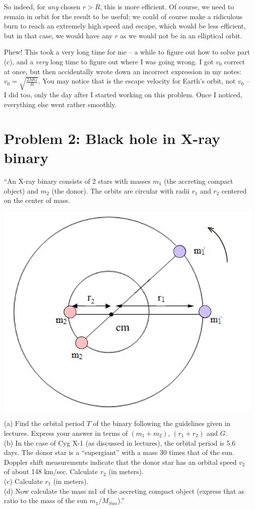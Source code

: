 \documentclass[8.01x]{subfiles}
\begin{document}
So indeed, for \emph{any} chosen $r > R$, this is more efficient. Of course, we need to remain in orbit for the result to be useful; we could of course make a ridiculous burn to reach an extremely high speed and escape, which would be less efficient, but in that case, we would have any $r$ as we would not be in an elliptical orbit.

Phew! This took a very long time for me -- a while to figure out how to solve part (c), and a \emph{very} long time to figure out where I was going wrong. I got $v_0$ correct at once, but then accidentally wrote down an incorrect expression in my notes: $\displaystyle v_0 = \sqrt{\frac{2 M G}{R}}$. You may notice that is the escape velocity for Earth's orbit, not $v_0$ -- I did too, only the day after I started working on this problem. Once I noticed, everything else went rather smoothly.

\section{Problem 2: Black hole in X-ray binary}

``An X-ray binary consists of 2 stars with masses $m_1$ (the accreting compact object) and $m_2$ (the donor). The orbits are circular with radii $r_1$ and $r_2$ centered on the center of mass.

\begin{center}
\includegraphics[scale=0.5]{Graphics/h8p2}
\end{center}

(a) Find the orbital period $T$ of the binary following the guidelines given in lectures. Express your answer in terms of $(m_1+m_2)$, $(r_1+r_2)$ and $G$.\\
(b) In the case of Cyg X-1 (as discussed in lectures), the orbital period is 5.6 days. The donor star is a ``supergiant'' with a mass 30 times that of the sun. Doppler shift measurements indicate that the donor star has an orbital speed $v_2$ of about 148 km/sec. Calculate $r_2$ (in meters).\\
(c) Calculate $r_1$ (in meters).\\
(d) Now calculate the mass m1 of the accreting compact object (express that as ratio to the mass of the sun $m_1/M_{Sun}$).''
\end{document}
